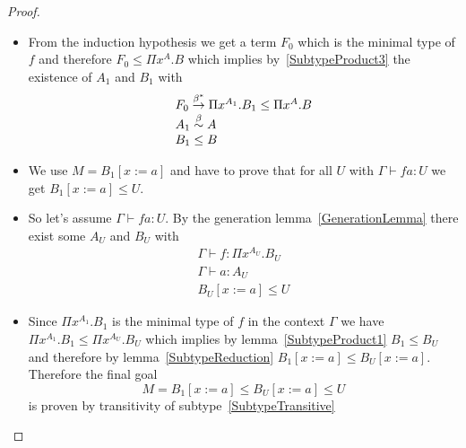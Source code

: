 \begin{theorem}
\begin{proof}
\begin{enumerate}
\begin{enumerate}
                    \begin{itemize}
                        \item
                        From the induction hypothesis we get a term $F_0$ which is
                        the minimal type of $f$ and therefore $F_0 \le \Pi x^A. B$
                        which implies by~\ref{SubtypeProduct3} the existence of
                        $A_1$ and $B_1$ with
                        $$
                        \begin{array}{l}
                            F_0 \stackrel{\beta^*}{\to} \Pi x^{A_1}. B_1 \le \Pi x^A.B
                            \\
                            A_1 \stackrel{\beta}{\sim} A
                            \\
                            B_1 \le B
                        \end{array}
                        $$

                        \item We use $M = B_1[x:=a]$ and have to prove that for
                            all $U$ with $\Gamma \vdash f a: U$ we get
                            $B_1[x:=a] \le U$.

                        \item So let's assume $\Gamma \vdash f a: U$. By the
                            generation lemma~\ref{GenerationLemma} there exist some
                                $A_U$ and $B_U$ with
                            $$
                            \begin{array}{l}
                                \Gamma \vdash f: \Pi x^{A_U}. B_U
                                \\
                                \Gamma \vdash a : A_U
                                \\
                                B_U[x:=a] \le U
                            \end{array}
                            $$

                        \item Since $\Pi x^{A_1}. B_1$ is the minimal type of
                            $f$ in the context $\Gamma$ we have $\Pi x^{A_1}.
                            {B_1} \le \Pi x^{A_U}. B_U$ which implies by
                            lemma~\ref{SubtypeProduct1} $B_1 \le B_U$ and
                            therefore by lemma~\ref{SubtypeReduction} $B_1[x:=a]
                            \le B_U[x:=a]$. Therefore the final goal
                            $$
                            M = B_1[x:=a] \le B_U[x:=a] \le U
                            $$ is proven by transitivity of
                            subtype~\ref{SubtypeTransitive}
                    \end{itemize}
            \end{enumerate}


\end{enumerate}
\end{proof}
\end{theorem}
